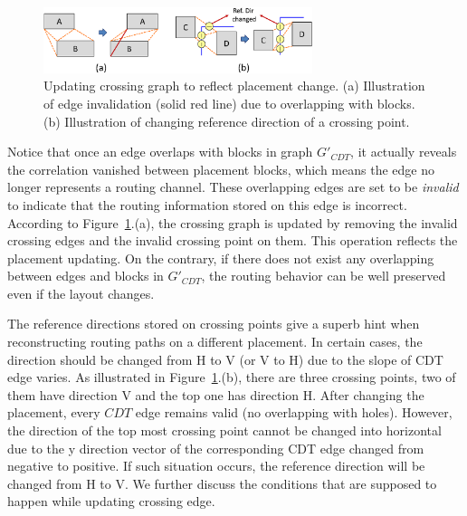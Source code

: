       \begin{figure}[ht]
        \begin{center}
        \includegraphics[width=0.7\textwidth]{Fig/Chapter4/updateG.eps}
        \caption{
          Updating crossing graph to reflect placement change.
          (a) Illustration of edge invalidation (solid red line) due to overlapping with blocks.
          (b) Illustration of changing reference direction of a crossing point.
          }
        \label{fig:updateG}
        \end{center}
      \end{figure}


      Notice that once an edge overlaps with blocks in graph $G'_{CDT}$, it actually reveals the correlation vanished between placement blocks, which means the edge no longer represents a routing channel. These overlapping edges are set to be {\it invalid} to indicate that the routing information stored on this edge is incorrect. According to Figure~\ref{fig:updateG}.(a), the crossing graph is updated by removing the invalid crossing edges and the invalid crossing point on them. This operation reflects the placement updating. On the contrary, if there does not exist any overlapping between edges and blocks in $G'_{CDT}$, the routing behavior can be well preserved even if the layout changes.


      The reference directions stored on crossing points give a superb hint when reconstructing routing paths on a different placement.
      In certain cases, the direction should be changed from H to V (or V to H) due to the slope of CDT edge varies. As illustrated in Figure~\ref{fig:updateG}.(b), there are three crossing points, two of them have direction V and the top one has direction H. After changing the placement, every $CDT$ edge remains valid (no overlapping with holes). However, the direction of the top most crossing point cannot be changed into horizontal due to the y direction vector of the corresponding CDT edge changed from negative to positive. If such situation occurs, the reference direction will be changed from H to V. We further discuss the conditions that are supposed to happen while updating crossing edge.


